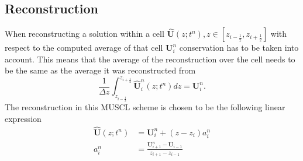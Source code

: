 \documentclass[a4paper, oneside]{discothesis}
\begin{document}
\subsection{Reconstruction} \label{ssec:reco}
When reconstructing a solution within a cell $\mathbf{\hat{U}}(z;t^n), z \in [z_{i-\frac{1}{2}}, z_{i+\frac{1}{2}}]$ with respect to the computed average of that cell $\mathbf{U}_i^n$ conservation has to be taken into account.
This means that the average of the reconstruction over the cell needs to be the same as the average it was reconstructed from 
\begin{equation}
	\frac{1}{\Delta z} \int_{z_{i-\frac{1}{2}}}^{z_{i+\frac{1}{2}}} \mathbf{\hat{U}}_i^n(z;t^n) dz = \mathbf{U}_i^n.
\end{equation}
The reconstruction in this MUSCL scheme is chosen to be the following linear expression
\begin{align}
	\mathbf{\hat{U}}(z;t^n) &= \mathbf{U}_i^n + (z-z_i)a_i^n \\
	a_i^n &= \frac{\mathbf{U}_{i+1}^n - \mathbf{U}_{i-1}}{z_{i+1} - z_{i-1}}
\end{align}
\end{document}
